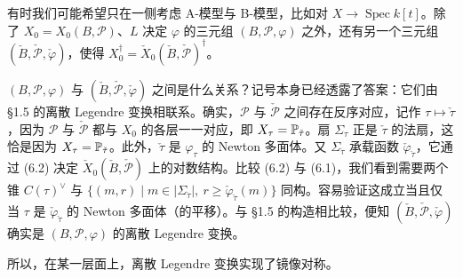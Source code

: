 有时我们可能希望只在一侧考虑 A-模型与 B-模型，比如对 $X\to\operatorname{Spec} k[t]$。除了 $X_0=X_0(B,\mathcal{P})$、$L$ 决定 $\varphi$ 的三元组 $(B,\mathcal{P},\varphi)$ 之外，还有另一个三元组 $(\check B,\check{\mathcal{P}},\check\varphi)$，使得 $X_0^{\dagger}=\check X_0(\check B,\check{\mathcal{P}})^{\dagger}$。

$(B,\mathcal{P},\varphi)$ 与 $(\check B,\check{\mathcal{P}},\check\varphi)$ 之间是什么关系？记号本身已经透露了答案：它们由 §1.5 的离散 Legendre 变换相联系。确实，$\mathcal{P}$ 与 $\check{\mathcal{P}}$ 之间存在反序对应，记作 $\tau\mapsto\check\tau$，因为 $\mathcal{P}$ 与 $\check{\mathcal{P}}$ 都与 $X_0$ 的各层一一对应，即 $X_\tau=\mathbb{P}_{\check\tau}$。扇 $\Sigma_\tau$ 正是 $\check\tau$ 的法扇，这恰是因为 $X_\tau=\mathbb{P}_{\check\tau}$。此外，$\check\tau$ 是 $\varphi_\tau$ 的 Newton 多面体。又 $\Sigma_{\check\tau}$ 承载函数 $\check\varphi_{\check\tau}$，它通过 (6.2) 决定 $\check X_0(\check B,\check{\mathcal{P}})$ 上的对数结构。比较 (6.2) 与 (6.1)，我们看到需要两个锥 $C(\tau)^{\vee}$ 与 $\{(m,r)\mid m\in|\Sigma_{\check\tau}|,\ r\ge\check\varphi_{\check\tau}(m)\}$ 同构。容易验证这成立当且仅当 $\tau$ 是 $\check\varphi_{\check\tau}$ 的 Newton 多面体（的平移）。与 §1.5 的构造相比较，便知 $(\check B,\check{\mathcal{P}},\check\varphi)$ 确实是 $(B,\mathcal{P},\varphi)$ 的离散 Legendre 变换。

所以，在某一层面上，离散 Legendre 变换实现了镜像对称。

